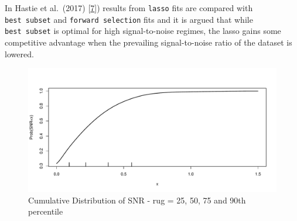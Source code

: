 \documentclass[
]{book}
\newenvironment{Shaded}{\begin{snugshade}}{\end{snugshade}}
\newcommand{\CommentTok}[1]{\textcolor[rgb]{0.56,0.35,0.01}{\textit{#1}}}
\newcommand{\DataTypeTok}[1]{\textcolor[rgb]{0.13,0.29,0.53}{#1}}
\newcommand{\DecValTok}[1]{\textcolor[rgb]{0.00,0.00,0.81}{#1}}
\newcommand{\FloatTok}[1]{\textcolor[rgb]{0.00,0.00,0.81}{#1}}
\newcommand{\KeywordTok}[1]{\textcolor[rgb]{0.13,0.29,0.53}{\textbf{#1}}}
\newcommand{\NormalTok}[1]{#1}
\newcommand{\OperatorTok}[1]{\textcolor[rgb]{0.81,0.36,0.00}{\textbf{#1}}}
\newcommand{\StringTok}[1]{\textcolor[rgb]{0.31,0.60,0.02}{#1}}
\begin{document}
In Hastie et al.~(2017) {[}\protect\hyperlink{ref-Hastie:2017aa}{7}{]}) results from \texttt{lasso} fits are
compared with \texttt{best\ subset} and \texttt{forward\ selection} fits and it is argued
that while \texttt{best\ subset} is optimal for high signal-to-noise regimes,
the lasso gains some competitive advantage when the prevailing signal-to-noise
ratio of the dataset is lowered.

\begin{Shaded}
\end{Shaded}

\begin{figure}
\centering
\includegraphics{Static/figures/brcaRna-preproc-plotSNR-1.pdf}
\caption{\label{fig:brcaRna-preproc-plotSNR}Cumulative Distribution of SNR - rug = 25, 50, 75 and 90th percentile}
\end{figure}
\end{document}
